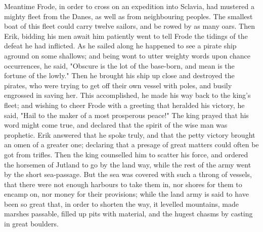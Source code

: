 \documentclass[10pt,a4paper]{report}
\begin{document}
Meantime Frode, in order to cross on an expedition into Sclavia, had mustered a mighty fleet from the Danes, as well as from neighbouring peoples. The smallest boat of this fleet could carry twelve sailors, and be rowed by as many oars. Then Erik, bidding his men await him patiently went to tell Frode the tidings of the defeat he had inflicted. As he sailed along he happened to see a pirate ship aground on some shallows; and being wont to utter weighty words upon chance occurrences, he said, "Obscure is the lot of the base-born, and mean is the fortune of the lowly." Then he brought his ship up close and destroyed the pirates, who were trying to get off their own vessel with poles, and busily engrossed in saving her. This accomplished, he made his way back to the king's fleet; and wishing to cheer Frode with a greeting that heralded his victory, he said, "Hail to the maker of a most prosperous peace!" The king prayed that his word might come true, and declared that the spirit of the wise man was prophetic. Erik answered that he spoke truly, and that the petty victory brought an omen of a greater one; declaring that a presage of great matters could often be got from trifles. Then the king counselled him to scatter his force, and ordered the horsemen of Jutland to go by the land way, while the rest of the army went by the short sea-passage. But the sea was covered with such a throng of vessels, that there were not enough harbours to take them in, nor shores for them to encamp on, nor money for their provisions; while the land army is said to have been so great that, in order to shorten the way, it levelled mountains, made marshes passable, filled up pits with material, and the hugest chasms by casting in great boulders.\\
\end{document}
